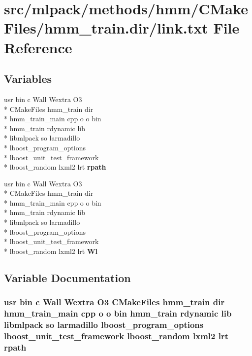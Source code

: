 \section{src/mlpack/methods/hmm/\-C\-Make\-Files/hmm\-\_\-train.dir/link.txt File Reference}
\label{methods_2hmm_2CMakeFiles_2hmm__train_8dir_2link_8txt}
\subsection*{Variables}
\begin{DoxyCompactItemize}
\item 
usr bin c Wall Wextra O3 \\*
C\-Make\-Files hmm\-\_\-train dir \\*
hmm\-\_\-train\-\_\-main cpp o o bin \\*
hmm\-\_\-train rdynamic lib \\*
libmlpack so larmadillo \\*
lboost\-\_\-program\-\_\-options \\*
lboost\-\_\-unit\-\_\-test\-\_\-framework \\*
lboost\-\_\-random lxml2 lrt {\bf rpath}
\item 
usr bin c Wall Wextra O3 \\*
C\-Make\-Files hmm\-\_\-train dir \\*
hmm\-\_\-train\-\_\-main cpp o o bin \\*
hmm\-\_\-train rdynamic lib \\*
libmlpack so larmadillo \\*
lboost\-\_\-program\-\_\-options \\*
lboost\-\_\-unit\-\_\-test\-\_\-framework \\*
lboost\-\_\-random lxml2 lrt {\bf Wl}
\end{DoxyCompactItemize}


\subsection{Variable Documentation}
\subsubsection[{rpath}]{\setlength{\rightskip}{0pt plus 5cm}usr bin c Wall Wextra O3 C\-Make\-Files hmm\-\_\-train dir hmm\-\_\-train\-\_\-main cpp o o bin hmm\-\_\-train rdynamic lib libmlpack so larmadillo lboost\-\_\-program\-\_\-options lboost\-\_\-unit\-\_\-test\-\_\-framework lboost\-\_\-random lxml2 lrt rpath}\label{methods_2hmm_2CMakeFiles_2hmm__train_8dir_2link_8txt_a7ec7513ce88572a2fa5c5a1c8bae51b0}


